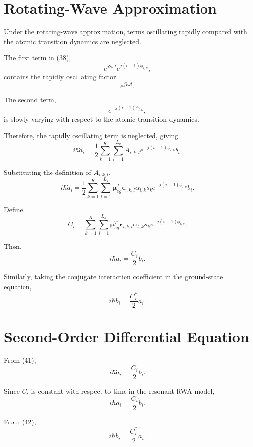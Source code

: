 \documentclass[12pt,a4paper]{article}
\begin{document}
\section{Rotating-Wave Approximation}

Under the rotating-wave approximation, terms oscillating rapidly
compared with the atomic transition dynamics are neglected.

The first term in (38),
\[
e^{j2\omega t}
e^{j(i-1)\phi_{l,k}},
\]
contains the rapidly oscillating factor
\[
e^{j2\omega t}.
\]

The second term,
\[
e^{-j(i-1)\phi_{l,k}},
\]
is slowly varying with respect to the atomic transition dynamics.

Therefore, the rapidly oscillating term is neglected, giving
\[
\boxed{
i\hbar\dot a_i
=
\frac{1}{2}
\sum_{k=1}^{K}
\sum_{l=1}^{L_k}
A_{i,k,l}
e^{-j(i-1)\phi_{l,k}}
b_i.
}
\tag{39}
\]

Substituting the definition of \(A_{i,k,l}\),
\[
i\hbar\dot a_i
=
\frac{1}{2}
\sum_{k=1}^{K}
\sum_{l=1}^{L_k}
\boldsymbol{\mu}_{eg}^{T}
\boldsymbol{\epsilon}_{i,k,l}
\alpha_{l,k}s_k
e^{-j(i-1)\phi_{l,k}}
b_i.
\]

Define
\begin{equation}
\boxed{
C_i
=
\sum_{k=1}^{K}
\sum_{l=1}^{L_k}
\boldsymbol{\mu}_{eg}^{T}
\boldsymbol{\epsilon}_{i,k,l}
\alpha_{l,k}s_k
e^{-j(i-1)\phi_{l,k}}.
}
\tag{40}
\end{equation}

Then,
\begin{equation}
\boxed{
i\hbar\dot a_i
=
\frac{C_i}{2}b_i.
}
\tag{41}
\end{equation}

Similarly, taking the conjugate interaction coefficient in the
ground-state equation,
\begin{equation}
\boxed{
i\hbar\dot b_i
=
\frac{C_i^{*}}{2}a_i.
}
\tag{42}
\end{equation}


\section{Second-Order Differential Equation}

From (41),
\[
i\hbar\dot a_i
=
\frac{C_i}{2}b_i.
\]

Since \(C_i\) is constant with respect to time in the resonant
RWA model,
\[
i\hbar\ddot a_i
=
\frac{C_i}{2}\dot b_i.
\]

From (42),
\[
i\hbar\dot b_i
=
\frac{C_i^{*}}{2}a_i.
\]
\end{document}

